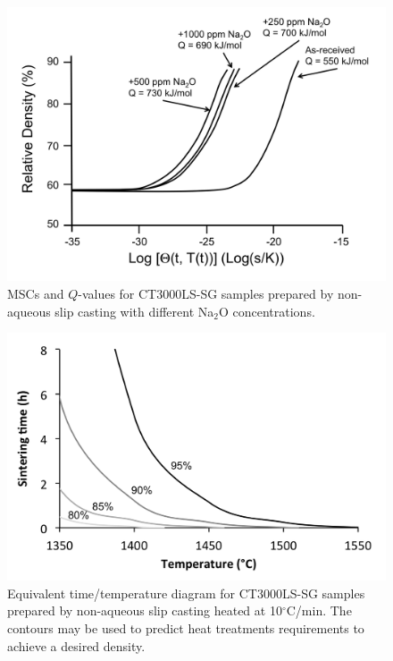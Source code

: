 \newpage
\begin{figure}[H]
	\centering
	\includegraphics[width=\textwidth]{Chapter-6/Figures/Figure10.png}
	\caption{MSCs and $Q$-values for CT3000LS-SG samples prepared by non-aqueous slip casting with different Na$_{2}$O concentrations.}
	\label{Ch6-figure:Figure10}
\end{figure}

\newpage
\begin{figure}[H]
	\centering
	\includegraphics[width=\textwidth]{Chapter-6/Figures/Figure11.png}
	\caption{Equivalent time/temperature diagram for CT3000LS-SG samples prepared by non-aqueous slip casting heated at 10$^{\circ}$C/min. The contours may be used to predict heat treatments requirements to achieve a desired density.}
	\label{Ch6-figure:Figure11}
\end{figure}
